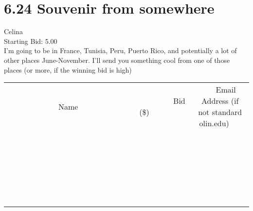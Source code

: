 \documentclass[11pt]{article}
\begin{document}
					\section*{6.24 Souvenir from somewhere}
					Celina \\
					Starting Bid: 5.00 \\
					I'm going to be in France, Tunisia, Peru, Puerto Rico, and potentially a lot of other places June-November. I'll send you something cool from one of those places (or more, if the winning bid is high) \\
					[6ex]
					\begin{tabular}{c c c}
						~~~~~~~~~~~~~Name~~~~~~~~~~~~~ & ~~~~~~~~~Bid (\$)~~~~~~~~~ & ~~~Email Address (if not standard olin.edu)~~~ \\
				
 & & \\
\hline
 & & \\
\hline
 & & \\
\hline
 & & \\
\hline
 & & \\
\hline
 & & \\
\hline
 & & \\
\hline
 & & \\
\hline
 & & \\
\hline
 & & \\
\hline
 & & \\
\hline
 & & \\
\hline
 & & \\
\hline
 & & \\
\hline
 & & \\
\hline
 & & \\
\hline
 & & \\
\hline
 & & \\
\hline
 & & \\
\hline
 & & \\
\hline
 & & \\
\hline
 & & \\
\hline
 & & \\
\hline
 & & \\
\hline
 & & \\
\hline
 & & \\
\hline
					\end{tabular}
					\clearpage
				
\end{document}
